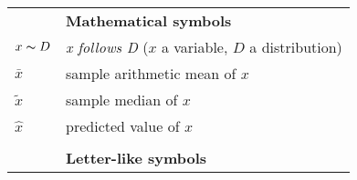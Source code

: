 \begin{longtable}{p{}p{}}

		    &  \textbf{Mathematical symbols} \\

  $x\thicksim D$    & \textit{x follows D} ($x$ a variable, $D$ a distribution) \\
  $\bar{x}$         & sample arithmetic mean of $x$\\
  $\tilde{x}$       & sample median of $x$\\
  $\hat{x}$         & predicted value of $x$\\

                    & \\
		    &  \textbf{Letter-like symbols} \\


\end{longtable}
